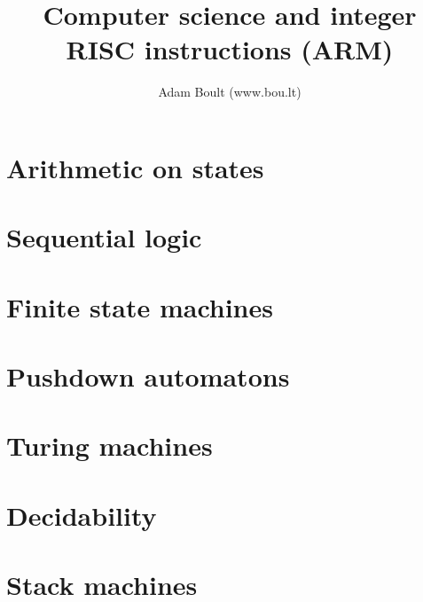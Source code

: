 \documentclass[oneside]{book}
\begin{document}
\author{Adam Boult (www.bou.lt)}
\title{Computer science and integer RISC instructions (ARM)}
\maketitle

\setcounter{tocdepth}{0}
\tableofcontents



\part{Arithmetic on states}






\part{Sequential logic}



\part{Finite state machines}



\part{Pushdown automatons}




\part{Turing machines}





\part{Decidability}











\part{Stack machines}

\end{document}
